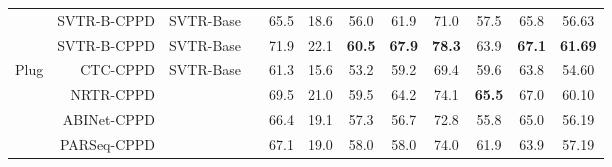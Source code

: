 \documentclass[10pt,journal,compsoc]{IEEEtran}
\begin{document}
\begin{table*}[t]
{\begin{tabular}{c|r|c|c|ccccccc|c}
                      & SVTR-B-CPPD  & SVTR-Base    &  & 65.5                 & 18.6                                                      & 56.0                 & 61.9                 & 71.0                 & 57.5                                                   & 65.8                 & 56.63                                             \\
\cline{4-4} & SVTR-B-CPPD  & SVTR-Base &     & 71.9 & 22.1 & \textbf{60.5} & \textbf{67.9} & \textbf{78.3} & 63.9 & \textbf{67.1}                                                                       & \textbf{61.69}                                                                                 \\
\hline
\multirow{4}{*}{Plug} & CTC-CPPD & \multirow{4}{*}{SVTR-Base} & \multirow{4}{*}{}   & 61.3                 & 15.6                                                      & 53.2                 & 59.2                 & 69.4                 & 59.6                                                   & 63.8                 & 54.60                                             \\
                      & NRTR-CPPD &  & & 69.5                 & 21.0                                                      & 59.5                 & 64.2                 & 74.1                 & \textbf{65.5}                                                   & 67.0                 & 60.10                                             \\
                      & ABINet-CPPD &  & & 66.4                 & 19.1                                                      & 57.3                 & 56.7                 & 72.8                 & 55.8                                                   & 65.0                 & 56.19                                             \\
                      & PARSeq-CPPD &  & & 67.1                 & 19.0                                                      & 58.0                 & 58.0                 & 74.0                 & 61.9                                                   & 63.9                 & 57.19                                            
  \\

                      \hline
\end{tabular}
}

\label{tab:difficult_result}
\end{table*}
\end{document}
